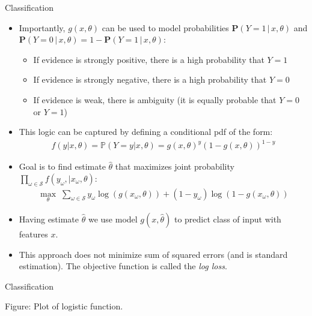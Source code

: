 \documentclass[9pt]{beamer}
\begin{document}
\begin{frame}{Classification}


\begin{itemize}

\item Importantly, $g(x,\theta)$ can be used to model probabilities $\mathbf{P}(Y=1\,|\,x,\theta)$ and $\mathbf{P}(Y=0\,|\,x,\theta)=1-\mathbf{P}(Y=1\,|\,x,\theta)$:

\begin{itemize}
\item If evidence is strongly positive, there is a high probability that $Y=1$
\item If evidence is strongly negative, there is a high probability that  $Y=0$
\item If evidence is weak, there is ambiguity (it is equally probable that $Y=0$ or $Y=1$)
\end{itemize}

\item This logic can be captured by defining a conditional pdf of the form:
\begin{align*}
f(y|x,\theta)=\mathbb{P}(Y=y|x,\theta)=g(x,\theta)^y(1-g(x,\theta))^{1-y}
\end{align*}
\item Goal is to find estimate $\hat{\theta}$ that maximizes joint probability $\prod_{\omega \in \mathcal{S}}f(y_\omega,|x_\omega,\theta)$:
\begin{align*}
\max_{\theta}\; \sum_{\omega \in \mathcal{S}}y_\omega\log(g(x_\omega,\theta))+(1-y_\omega)\log(1-g(x_\omega,\theta))
\end{align*}

\item Having estimate $\hat{\theta}$ we use model $g(x,\hat{\theta})$ to predict class of input with features $x$. 

\item This approach does not minimize sum of squared errors (and is standard estimation).  The objective function is called the {\em log loss}. 
\end{itemize}

\end{frame}

%
\begin{frame}{Classification}

\begin{block}{}
Figure: Plot of logistic function.
\end{block}

\end{frame}
\end{document}
